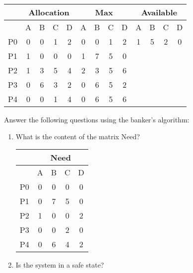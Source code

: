 \begin{enumerate}
    \begin{center}
        \begin{tabular}{|c|c|c|c|c|c|c|c|c|c|c|c|c|}
            \hline
               & \multicolumn{4}{|c|}{Allocation} & \multicolumn{4}{|c|}{Max} & \multicolumn{4}{|c|}{Available}  \\
            \hline
               & A & B & C & D & A & B & C & D & A & B & C & D \\
            \hline
            P0 & 0 & 0 & 1 & 2 & 0 & 0 & 1 & 2 & 1 & 5 & 2 & 0 \\
            \hline
            P1 & 1 & 0 & 0 & 0 & 1 & 7 & 5 & 0 &  &  &  & \\	
            \hline
            P2 & 1 & 3 & 5 & 4 & 2 & 3 & 5 & 6 &  &  &  & \\	
            \hline
            P3 & 0 & 6 & 3 & 2 & 0 & 6 & 5 & 2 &  &  &  & \\	
            \hline
            P4 & 0 & 0 & 1 & 4 & 0 & 6 & 5 & 6 &  &  &  & \\	
            \hline
        \end{tabular}
    \end{center}
    
    Answer the following questions using the banker's algorithm:
    \begin{enumerate}
        \item What is the content of the matrix Need?
        
        \begin{center}
            \begin{tabular}{|c|c|c|c|c|}
                \hline
                   & \multicolumn{4}{|c|}{Need} \\
                \hline
                   & A & B & C & D \\
                \hline
                P0 & 0 & 0 & 0 & 0 \\
                \hline
                P1 & 0 & 7 & 5 & 0 \\
                \hline
                P2 & 1 & 0 & 0 & 2 \\
                \hline
                P3 & 0 & 0 & 2 & 0 \\
                \hline
                P4 & 0 & 6 & 4 & 2 \\
                \hline
            \end{tabular}
        \end{center}
        
        \item Is the system in a safe state?
        

\end{enumerate}
\end{enumerate}
